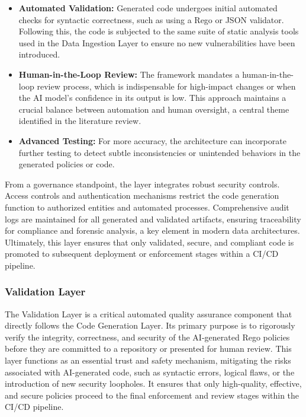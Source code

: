 \begin{itemize}
    \item \textbf{Automated Validation:} Generated code undergoes initial automated checks for syntactic correctness, such as using a Rego or JSON validator. Following this, the code is subjected to the same suite of static analysis tools used in the Data Ingestion Layer to ensure no new vulnerabilities have been introduced.
    \item \textbf{Human-in-the-Loop Review:} The framework mandates a human-in-the-loop review process, which is indispensable for high-impact changes or when the AI model's confidence in its output is low. This approach maintains a crucial balance between automation and human oversight, a central theme identified in the literature review.
    \item \textbf{Advanced Testing:} For more accuracy, the architecture can incorporate further testing to detect subtle inconsistencies or unintended behaviors in the generated policies or code.
\end{itemize}

From a governance standpoint, the layer integrates robust security controls. Access controls and authentication mechanisms restrict the code generation function to authorized entities and automated processes. Comprehensive audit logs are maintained for all generated and validated artifacts, ensuring traceability for compliance and forensic analysis, a key element in modern data architectures\cite{ismail_big_2025-1}. Ultimately, this layer ensures that only validated, secure, and compliant code is promoted to subsequent deployment or enforcement stages within a CI/CD pipeline.


\subsubsection{Validation Layer} %
\label{sec:Validation Layer}

The Validation Layer is a critical automated quality assurance component that directly follows the Code Generation Layer. Its primary purpose is to rigorously verify the integrity, correctness, and security of the AI-generated Rego policies before they are committed to a repository or presented for human review. This layer functions as an essential trust and safety mechanism, mitigating the risks associated with AI-generated code, such as syntactic errors, logical flaws, or the introduction of new security loopholes. It ensures that only high-quality, effective, and secure policies proceed to the final enforcement and review stages within the CI/CD pipeline.

